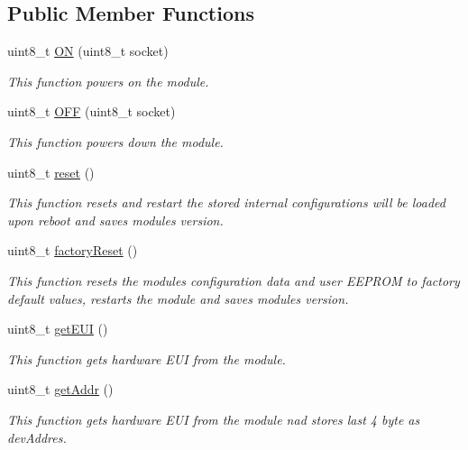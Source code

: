 \subsection*{Public Member Functions}
\begin{DoxyCompactItemize}
\item 
uint8\+\_\+t \hyperlink{class_wasp_lo_ra_w_a_n_ab0548a7036908e951d505014cb34a1e1}{ON} (uint8\+\_\+t socket)
\begin{DoxyCompactList}\small\item\em This function powers on the module. \end{DoxyCompactList}\item 
uint8\+\_\+t \hyperlink{class_wasp_lo_ra_w_a_n_a3315ca2f4cf72e1da5a88a00237b8677}{O\+FF} (uint8\+\_\+t socket)
\begin{DoxyCompactList}\small\item\em This function powers down the module. \end{DoxyCompactList}\item 
uint8\+\_\+t \hyperlink{class_wasp_lo_ra_w_a_n_af203684a732d1cf7294ee69de6c30d85}{reset} ()
\begin{DoxyCompactList}\small\item\em This function resets and restart the stored internal configurations will be loaded upon reboot and saves modules version. \end{DoxyCompactList}\item 
uint8\+\_\+t \hyperlink{class_wasp_lo_ra_w_a_n_afcea57ea0d97106b353c6166b711a03c}{factory\+Reset} ()
\begin{DoxyCompactList}\small\item\em This function resets the module\textquotesingle{}s configuration data and user E\+E\+P\+R\+OM to factory default values, restarts the module and saves modules version. \end{DoxyCompactList}\item 
uint8\+\_\+t \hyperlink{class_wasp_lo_ra_w_a_n_ad9348efd062e4feea102ad61c5fa27a0}{get\+E\+UI} ()
\begin{DoxyCompactList}\small\item\em This function gets hardware E\+UI from the module. \end{DoxyCompactList}\item 
uint8\+\_\+t \hyperlink{class_wasp_lo_ra_w_a_n_a70fcea0bc5798a61f600de1b18ae4409}{get\+Addr} ()
\begin{DoxyCompactList}\small\item\em This function gets hardware E\+UI from the module nad stores last 4 byte as dev\+Addres. \end{DoxyCompactList}\item 

\end{DoxyCompactItemize}
